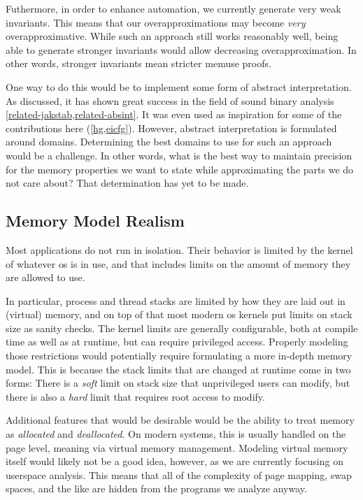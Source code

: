 Futhermore, in order to enhance automation, we currently generate very weak invariants.
This means that our overapproximations may become \emph{very} overapproximative.
While such an approach still works reasonably well, being able to generate stronger invariants would allow decreasing overapproximation.
In other words, stronger invariants mean stricter \gls{memuse} proofs.

One way to do this would be to implement some form of abstract interpretation. %
As discussed, it has shown great success in the field of sound binary analysis \cref{related-jakstab,related-absint}.
It was even used as inspiration for some of the contributions here (\cref{hg,eicfg}).
However, abstract interpretation is formulated around domains.
Determining the best domains to use for such an approach would be a challenge.
In other words, what is the best way to maintain precision for the memory properties we want to state while approximating the parts we do not care about?
That determination has yet to be made.

\subsection{Memory Model Realism}
Most applications do not run in isolation.
Their behavior is limited by the kernel of whatever \ac{os} is in use, and that includes limits on the amount of memory they are allowed to use.

In particular, process and thread stacks are limited by how they are laid out in (virtual) memory, and on top of that most modern \ac{os} kernels put limits on stack size as sanity checks.
The kernel limits are generally configurable, both at compile time as well as at runtime, but can require privileged access.
Properly modeling those restrictions would potentially require formulating a more in-depth memory model.
This is because the stack limits that are changed at runtime come in two forms:
There is a \emph{soft} limit on stack size that unprivileged users can modify, but there is also a \emph{hard} limit that requires root access to modify.

Additional features that would be desirable would be the ability to treat memory as \emph{allocated} and \emph{deallocated}.
On modern systems, this is usually handled on the page level, meaning via virtual memory management.
Modeling virtual memory itself would likely not be a good idea, however, as we are currently focusing on userspace analysis.
This means that all of the complexity of page mapping, swap spaces, and the like are hidden from the programs we analyze anyway.

